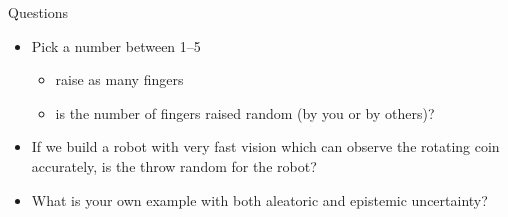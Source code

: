 \documentclass[english,t]{beamer}
\begin{document}
\begin{frame}{Questions}

  \begin{itemize}
  \item<1-> Pick a number between 1--5
    \begin{itemize}
    \item<2-> raise as many fingers 
    \item<3-> is the number of fingers raised random (by you or by others)?
    \end{itemize}
    \vspace{\baselineskip}
  \item<4-> If we build a robot with very fast vision which can observe
    the rotating coin accurately, is the throw random for the robot?
    \vspace{\baselineskip}
  \item<5-> What is your own example with both aleatoric and epistemic
    uncertainty?
  \end{itemize}
\end{frame}
\end{document}
